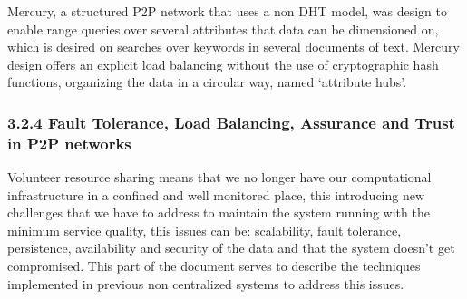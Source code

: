 Mercury\cite{Bharambe}, a structured P2P network that uses a non DHT model, was design to enable range queries over several attributes that data can be dimensioned on, which is desired on searches over keywords in several documents of text. Mercury design offers an explicit load balancing without the use of cryptographic hash functions, organizing the data in a circular way, named `attribute hubs'.








\subsubsection{3.2.4 Fault Tolerance, Load Balancing, Assurance and Trust in P2P networks}

Volunteer resource sharing means that we no longer have our computational infrastructure in a confined and well monitored place, this introducing new challenges that we have to address \cite{Koloniari2005} to maintain the system running with the minimum service quality, this issues can be: scalability, fault tolerance, persistence, availability and security\cite{Wallach} of the data and that the system doesn't get compromised. This part of the document serves to describe the techniques implemented in previous non centralized systems to address this issues.


